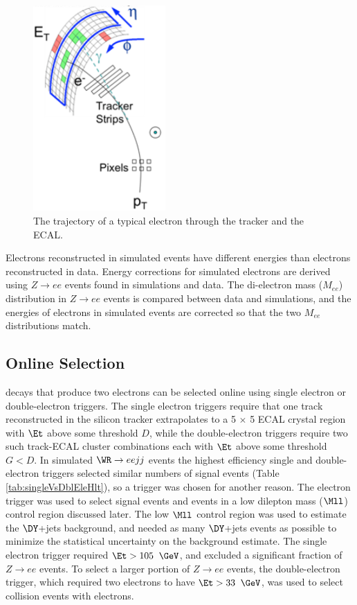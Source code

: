 \begin{figure}[h]
	\centering
	\includegraphics[width=0.45\textwidth]{figures/electronTrackAndSupercluster.png}
	\caption{The trajectory of a typical electron through the tracker and the ECAL.}
	\label{fig:eleTrackAndSC}
\end{figure}

Electrons reconstructed in simulated events have different energies than electrons reconstructed in data.  Energy 
corrections for simulated electrons are derived using $Z \rightarrow ee$ events found in simulations and data.  The di-electron mass 
($M_{ee}$) distribution in $Z \rightarrow ee$ events is compared between data and simulations, and the energies of electrons 
in simulated events are corrected so that the two $M_{ee}$ distributions match.

\subsection{Online Selection}
\WR decays that produce two electrons can be selected online using single electron or double-electron triggers.  The single electron 
triggers require that one track reconstructed in the silicon tracker extrapolates to a 5 $\times$ 5 ECAL crystal region with $\Et$ above some 
threshold $D$, while the double-electron triggers require two such track-ECAL cluster combinations each with $\Et$ above some threshold 
$G < D$.  In simulated $\WR \rightarrow eejj$ events the highest efficiency single and double-electron triggers selected similar numbers 
of signal events (Table \ref{tab:singleVsDblEleHlt}), so a trigger was chosen for another reason.  The electron trigger was used 
to select signal events and events in a low dilepton mass ($\Mll$) control region discussed later.  The low $\Mll$ control region was 
used to estimate the $\DY$+jets background, and needed as many $\DY$+jets events as possible to minimize the statistical uncertainty 
on the background estimate.  The single electron trigger required $\Et > 105$ $\GeV$, and excluded a significant fraction of 
$Z \rightarrow ee$ events.  To select a larger portion of $Z \rightarrow ee$ events, the double-electron trigger, which required two 
electrons to have $\Et > 33$ $\GeV$, was used to select collision events with electrons.

